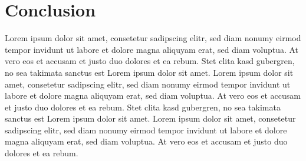 \documentclass{vgtc}                          %
\begin{document}
\section{Conclusion}

Lorem ipsum dolor sit amet, consetetur sadipscing elitr, sed diam
nonumy eirmod tempor invidunt ut labore et dolore magna aliquyam erat,
sed diam voluptua. At vero eos et accusam et justo duo dolores et ea
rebum. Stet clita kasd gubergren, no sea takimata sanctus est Lorem
ipsum dolor sit amet. Lorem ipsum dolor sit amet, consetetur
sadipscing elitr, sed diam nonumy eirmod tempor invidunt ut labore et
dolore magna aliquyam erat, sed diam voluptua. At vero eos et accusam
et justo duo dolores et ea rebum. Stet clita kasd gubergren, no sea
takimata sanctus est Lorem ipsum dolor sit amet. Lorem ipsum dolor sit
amet, consetetur sadipscing elitr, sed diam nonumy eirmod tempor
invidunt ut labore et dolore magna aliquyam erat, sed diam
voluptua. At vero eos et accusam et justo duo dolores et ea
rebum.



%

%
%
%


\end{document}

